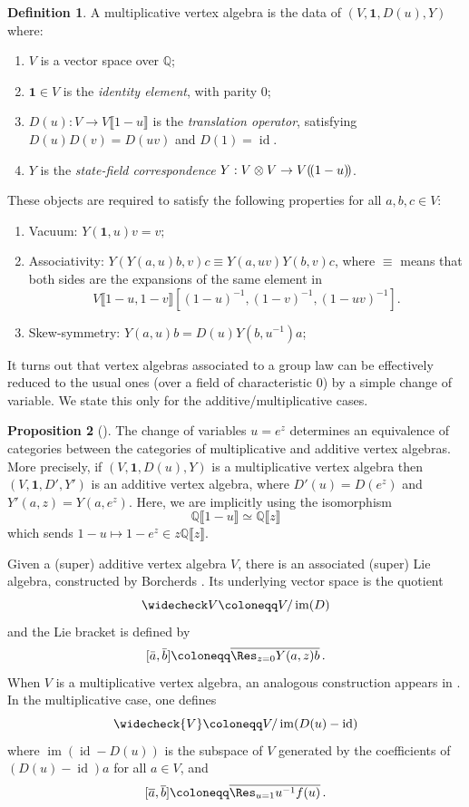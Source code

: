 \documentclass[12pt]{amsart}
\theoremstyle{definition}
\newtheorem{definition}{Definition}[section]
\newtheorem{proposition}[definition]{Proposition}
\newcommand{\BQ}{{\mathbb{Q}}}
\newcommand{\1}{\mathbf 1}
\DeclareMathOperator{\id}{id}
\DeclareMathOperator{\im}{im}
\newcommand{\lpp}{(\hspace{-0.15em}(}
\newcommand{\rpp}{)\hspace{-0.15em})}
\begin{document}
\begin{definition}\label{def: multva} A multiplicative vertex algebra is the data of $(V, \mathbf 1, D(u), Y)$ where:
\begin{enumerate}[label=(\roman*)]
        \item $V$ is a vector space over $\BQ$;
        \item $\mathbf 1 \in V$ is the \textit{identity element}, with parity 0;
        \item $D(u): V\to V\llbracket 1-u \rrbracket$ is the \textit{translation operator}, satisfying $D(u)D(v)=D(uv)$ and $D(1)=\id$.
        \item $Y$ is the \textit{state-field correspondence} $Y: V\otimes V\to V\lpp1-u\rpp$. 
    \end{enumerate}
    These objects are required to satisfy the following properties for all $a,b, c\in V$: 
    \begin{enumerate}[label=(\roman*)]\label{vertalg}
        \item Vacuum: $Y(\mathbf 1, u) v = v;$
        \item Associativity: $Y(Y(a, u)b, v)c\equiv Y(a, uv)Y(b, v)c$, where $\equiv$ means that both sides are the expansions of the same element in
$$V\llbracket 1-u, 1-v\rrbracket [(1-u)^{-1}, (1-v)^{-1},(1-uv)^{-1}].$$
        \item Skew-symmetry: $Y(a, u)b = D(u)Y(b, u^{-1})a$;
    \end{enumerate}
\end{definition}


 
It turns out that vertex algebras associated to a group law can be effectively reduced to the usual ones (over a field of characteristic 0) by a simple change of variable. We state this only for the additive/multiplicative cases.
\begin{proposition}[{\cite[Proposition 3.6]{liFVA}}]\label{prop: equiv}The change of variables $u=e^z$ determines an equivalence of categories between the categories of multiplicative and additive vertex algebras. More precisely, if $(V, \1, D(u), Y)$ is a multiplicative vertex algebra then $(V, \1, D', Y')$ is an additive vertex algebra, where $D'(u)=D(e^z)$ and $Y'(a, z)=Y(a, e^z)$. Here, we are implicitly using the isomorphism
\[\BQ\llbracket 1-u\rrbracket \simeq \BQ\llbracket z\rrbracket\]
which sends $1-u\mapsto 1-e^z\in z\BQ\llbracket z\rrbracket$. 
\end{proposition}

Given a (super) additive vertex algebra $V$, there is an associated (super) Lie algebra, constructed by Borcherds \cite{Borcherds}. Its underlying vector space is the quotient
\[\widecheck V\coloneqq V/\im(D)\]
and the Lie bracket is defined by
\[[\bar a, \bar b]\coloneqq \overline{\Res_{z=0}Y(a,z)b}\,.\]
When $V$ is a multiplicative vertex algebra, an analogous construction appears in \cite[3.2.13]{Liu}. In the multiplicative case, one defines
\[\widecheck{V}\coloneqq V/\im(D(u)-\id)\]
where $\im(\id-D(u))$ is the subspace of $V$ generated by the coefficients of $(D(u)-\id)a$ for all $a \in V$, and
\[[\overline a, \overline b]\coloneqq \overline{\Res_{u=1}u^{-1}f(u)}\,.\]
\end{document}
